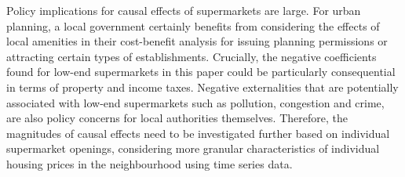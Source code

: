 \documentclass{article}
\begin{document}
Policy implications for causal effects of supermarkets are large. For urban planning, a local government certainly benefits from considering the effects of local amenities in their cost-benefit analysis for issuing planning permissions or attracting certain types of establishments. Crucially, the negative coefficients found for low-end supermarkets in this paper could be particularly consequential in terms of property and income taxes. Negative externalities that are potentially associated with low-end supermarkets such as pollution, congestion and crime, are also policy concerns for local authorities themselves. Therefore, the magnitudes of causal effects need to be investigated further based on individual supermarket openings, considering more granular characteristics of individual housing prices in the neighbourhood using time series data.

\newpage
\nocite{*}
\renewcommand\harvardyearleft{\unskip, }
\renewcommand\harvardyearright[1]{.}
\let\oldthebibliography\thebibliography
\renewcommand\thebibliography{\let\bf\relax\oldthebibliography}
\renewcommand{\refname}{\textbf{Bibliography}}
  


\end{document}
